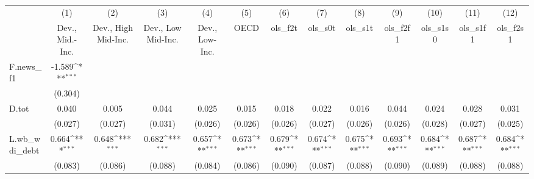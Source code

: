 {
\def\sym#1{\ifmmode^{#1}\else\(^{#1}\)\fi}
\begin{tabular}{l*{12}{c}}
\toprule
            &\multicolumn{1}{c}{(1)}&\multicolumn{1}{c}{(2)}&\multicolumn{1}{c}{(3)}&\multicolumn{1}{c}{(4)}&\multicolumn{1}{c}{(5)}&\multicolumn{1}{c}{(6)}&\multicolumn{1}{c}{(7)}&\multicolumn{1}{c}{(8)}&\multicolumn{1}{c}{(9)}&\multicolumn{1}{c}{(10)}&\multicolumn{1}{c}{(11)}&\multicolumn{1}{c}{(12)}\\
            &\multicolumn{1}{c}{Dev., Mid.-Inc.}&\multicolumn{1}{c}{Dev., High Mid-Inc.}&\multicolumn{1}{c}{Dev., Low Mid-Inc.}&\multicolumn{1}{c}{Dev., Low-Inc.}&\multicolumn{1}{c}{OECD}&\multicolumn{1}{c}{ols\_f2t}&\multicolumn{1}{c}{ols\_s0t}&\multicolumn{1}{c}{ols\_s1t}&\multicolumn{1}{c}{ols\_f2f1}&\multicolumn{1}{c}{ols\_s1s0}&\multicolumn{1}{c}{ols\_s1f1}&\multicolumn{1}{c}{ols\_f2s1}\\
\midrule
F.news\_f1   &      -1.589\sym{***}&                     &                     &                     &                     &                     &                     &                     &                     &                     &                     &                     \\
            &     (0.304)         &                     &                     &                     &                     &                     &                     &                     &                     &                     &                     &                     \\
\addlinespace
D.tot       &       0.040         &       0.005         &       0.044         &       0.025         &       0.015         &       0.018         &       0.022         &       0.016         &       0.044         &       0.024         &       0.028         &       0.031         \\
            &     (0.027)         &     (0.027)         &     (0.031)         &     (0.026)         &     (0.026)         &     (0.026)         &     (0.027)         &     (0.026)         &     (0.026)         &     (0.028)         &     (0.027)         &     (0.025)         \\
\addlinespace
L.wb\_wdi\_debt&       0.664\sym{***}&       0.648\sym{***}&       0.682\sym{***}&       0.657\sym{***}&       0.673\sym{***}&       0.679\sym{***}&       0.674\sym{***}&       0.675\sym{***}&       0.693\sym{***}&       0.684\sym{***}&       0.687\sym{***}&       0.684\sym{***}\\
            &     (0.083)         &     (0.086)         &     (0.088)         &     (0.084)         &     (0.086)         &     (0.090)         &     (0.087)         &     (0.088)         &     (0.090)         &     (0.089)         &     (0.088)         &     (0.088)         \\

\end{tabular}}
